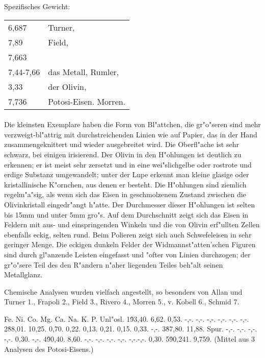 \documentclass[a4paper, 11pt, oneside]{article}
\begin{document}
Spezifisches Gewicht:  
\begin{table}[!ht]
    \centering
    \begin{tabular}{l l}
        6,687 & Turner,\\
        7,89 & Field,\\
        7,663 & \\
        7,44-7,66 & das Metall, Rumler,\\
        3,33 & der Olivin,\\
        7,736 & Potosi-Eisen. Morren.
    \end{tabular}
\end{table}
\paragraph{}
Die kleinsten Exemplare haben die Form von Bl"attchen, die gr"o"seren sind mehr verzweigt-bl"attrig mit durchstreichenden Linien wie auf Papier, das in der Hand zusammengeknittert und wieder ausgebreitet wird. Die Oberfl"ache ist sehr schwarz, bei einigen irisierend. Der Olivin in den H"ohlungen ist deutlich zu erkennen; er ist meist sehr zersetzt und in eine wei"slichgelbe oder rostrote und erdige Substanz umgewandelt; unter der Lupe erkennt man kleine glasige oder kristallinische K"ornchen, aus denen er besteht. Die H"ohlungen sind ziemlich regelm"a"sig, als wenn sich das Eisen in geschmolzenem Zustand zwischen die Olivinkristall eingedr"angt h"atte. Der Durchmesser dieser H"ohlungen ist selten bis 15mm und unter 5mm gro"s. Auf dem Durchschnitt zeigt sich das Eisen in Feldern mit aus- und einspringenden Winkeln und die von Olivin erf"ullten Zellen ebenfalls eckig, selten rund. Beim Polieren zeigt sich auch Schwefeleisen in sehr geringer Menge. Die eckigen dunkeln Felder der Widmannst"atten'schen Figuren sind durch gl"anzende Leisten eingefasst und "ofter von Linien durchzogen; der gr"o"sere Teil des den R"andern n"aher liegenden Teiles beh"alt seinen Metallglanz.

Chemische Analysen wurden vielfach angestellt, so besonders von
Allan und Turner 1., Frapoli 2., Field 3., Rivero 4., Morren 5.,
v. Kobell 6., Schmid 7.

Fe. Ni. Co. Mg. Ca. Na. K. P. Unl"osl.  
1\. 93,40. 6,62. 0,53. -,-. -,-. -,-. -,-. -,-. -,-.  
2\. 88,01. 10,25. 0,70. 0,22. 0,13. 0,21. 0,15. 0,33. -,-.  
3\. 87,80. 11,88. Spur. -,-. -,-. -,-. -,-. 0,30. -,-.  
4\. 90,40. 8,60. -,-. -,-. -,-. -,-. -,-.-,-. 0,30.  
5\. 90,241. 9,759. (Mittel aus 3 Analysen des Potosi-Eisens.)
\end{document}
